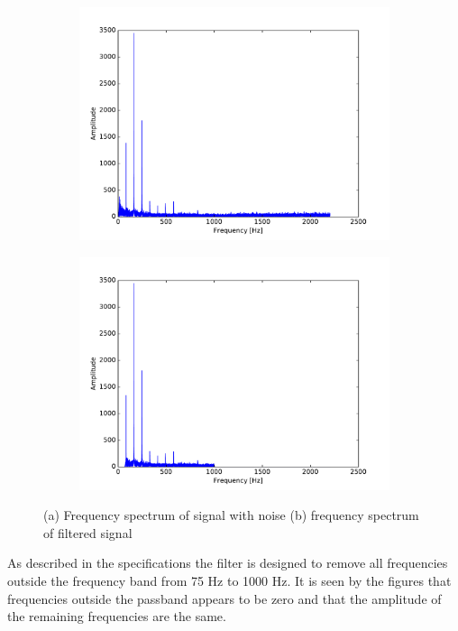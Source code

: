 \begin{figure}[H]
\centering
\begin{subfigure}{0.49\textwidth}
\centering
\includegraphics[width=\textwidth]{figures/filtertest/SIGNAL.pdf}
\caption{}
\label{fig:SIGNAL}
\end{subfigure}
\begin{subfigure}{0.49\textwidth}
\centering
\includegraphics[width=\textwidth]{figures/filtertest/filt_SIGNAL.pdf}
\caption{}
\label{fig:filt_SIGNAL}
\end{subfigure}
\caption{(a) Frequency spectrum of signal with noise (b) frequency spectrum of filtered signal}
\label{fig:test_res}
\end{figure}
As described in the specifications the filter is designed to remove all frequencies outside the frequency band from 75 Hz to 1000 Hz. It is seen by the figures that frequencies outside the passband appears to be zero and that the amplitude of the remaining frequencies are the same. \\
